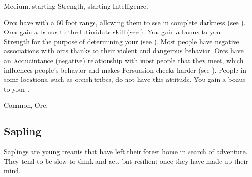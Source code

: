          Medium.
          starting Strength,  starting Intelligence.
        \begin{itemize}
             Orcs have  with a 60 foot range, allowing them to see in complete darkness (see ).
             Orcs gain a  bonus to the Intimidate skill (see ).
             You gain a  bonus to your Strength for the purpose of determining your  (see ).
             Most people have negative associations with orcs thanks to their violent and dangerous behavior.
                Orcs have an Acquaintance (negative) relationship with most people that they meet, which influences people's behavior and makes Persuasion checks harder (see ).
                People in some locations, such as orcish tribes, do not have this attitude.
             You gain a  bonus to your .
        \end{itemize}
         Common, Orc.

    \subsection{Sapling}

        Saplings are young treants that have left their forest home in search of adventure.
        They tend to be slow to think and act, but resilient once they have made up their mind.

